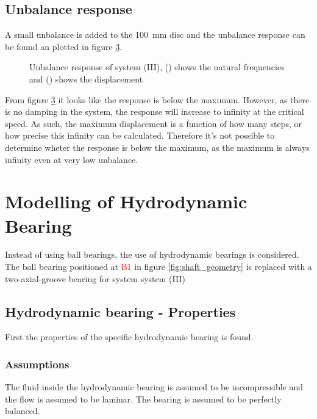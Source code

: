 \subsection{Unbalance response \label{sec:unbalance_response_ball_bearing}}
A small unbalance is added to the \SI{100}{\milli \meter} disc and the unbalance response can be found an plotted in figure \ref{fig:unbalance_response}.
\begin{figure}[ht]
\begin{subfigure}[t]{0.49\textwidth}
    \centering
    
    \caption{}
    \label{fig:unbalance_response_natural}
\end{subfigure}
\hfill
\begin{subfigure}[t]{0.49\textwidth}
    \centering
    
    \caption{}
    \label{fig:unbalance_response_disp}
\end{subfigure}
\caption{Unbalance response of system (III), () shows the natural frequencies and () shows the displacement}
\label{fig:unbalance_response}
\end{figure}
From figure \ref{fig:unbalance_response} it looks like the response is below the maximum. However, as there is no damping in the system,
the response will increase to infinity at the critical speed. As such, the maximum displacement is a function of how many steps, or how precise this infinity can be calculated.
Therefore it's not possible to determine wheter the response is below the maximum, as the maximum is always infinity even at very low unbalance.

\section{Modelling of Hydrodynamic Bearing}
Instead of using ball bearings, the use of hydrodynamic bearings is considered. The ball bearing positioned at \textcolor{red}{B1} in figure \ref{fig:shaft_geometry} is replaced with a two-axial-groove bearing for system  system (III)

\subsection{Hydrodynamic bearing - Properties}
First the properties of the specific hydrodynamic bearing is found.

\subsubsection{Assumptions}
The fluid inside the hydrodynamic bearing is assumed to be incompressible and the flow is assumed to be laminar. The bearing is assumed to be perfectly balanced.

